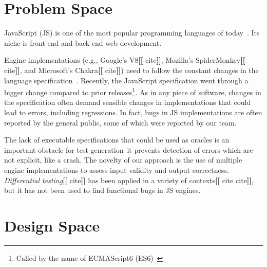 \documentclass[11pt]{article}
\newcommand{\eg}{e.g.}
\newcommand{\Fix}[1]{\textbf{[[}{\color{red} #1}\textbf{]]}}
\newcommand{\Comment}[1]{}
\begin{document}
\section{Problem Space}

JavaScript (JS) is one of the most popular programming languages of
today~\cite{business-insider,stackify}. Its niche is front-end and
back-end web development\Comment{, supported several frameworks and
  runtimes (\eg{}, Express.js and Node.js)}. 

Engine implementations (\eg{}, Google's V8\Fix{cite}, Mozilla's
SpiderMonkey\Fix{cite}, and Microsoft's Chakra\Fix{cite}) need to
follow the constant changes in the language
specification~\cite{kangax}. Recently, the JavaScript
specification went through a bigger change compared to prior
releases\footnote{Called by the name of ECMAScript6
  (ES6)~\cite{es6-features}}. As in any piece of software, changes in
the specification often demand sensible changes in implementations
that could lead to errors, including regressions. In fact, bugs in JS
implementations are often reported by the general public, some of
which were reported by our team.


The lack of executable specifications that could be used as oracles is
an important obstacle for test generation--it prevents detection of
errors which are not explicit, like a crash.  The novelty of our
approach is the use of multiple engine implementations to assess input
validity and output correctness. \emph{Differential testing}\Fix{cite}
has been applied in a variety of contexts\Fix{cite cite}, but it has
not been used to find functional bugs in JS engines.

\begin{center}
\end{center}

\section{Design Space}
\label{sec:design}
\end{document}
